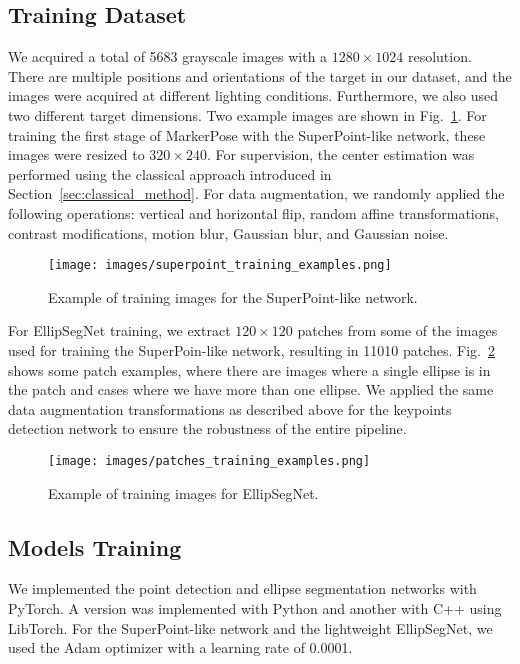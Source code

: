 \documentclass[final]{cvpr}
\begin{document}
\subsection{Training Dataset}
We acquired a total of 5683 grayscale images with a $1280 \times 1024$ resolution. There are multiple positions and orientations of the target in our dataset, and the images were acquired at different lighting conditions. Furthermore, we also used two different target dimensions. Two example images are shown in Fig.~\ref{fig:superpoint_training_example}. For training the first stage of MarkerPose with the SuperPoint-like network, these images were resized to $320 \times 240$. For supervision, the center estimation was performed using the classical approach introduced in Section~\ref{sec:classical_method}. For data augmentation, we randomly applied the following operations: vertical and horizontal flip, random affine transformations, contrast modifications, motion blur, Gaussian blur, and Gaussian noise.

\begin{figure}[h]
    \centering
    \texttt{[image: images/superpoint\_training\_examples.png]}
    \caption{Example of training images for the SuperPoint-like network.}
    \label{fig:superpoint_training_example}
\end{figure}

For EllipSegNet training, we extract $120 \times 120$ patches from some of the images used for training the SuperPoin-like network, resulting in 11010 patches. Fig.~\ref{fig:patches_training_examples} shows some patch examples, where there are images where a single ellipse is in the patch and cases where we have more than one ellipse. We applied the same data augmentation transformations as described above for the keypoints detection network to ensure the robustness of the entire pipeline.

\begin{figure}[h]
    \centering
    \texttt{[image: images/patches\_training\_examples.png]}
    \caption{Example of training images for EllipSegNet.}
    \label{fig:patches_training_examples}
\end{figure}



\subsection{Models Training}
We implemented the point detection and ellipse segmentation networks with PyTorch. A version was implemented with Python and another with C++ using LibTorch. For the SuperPoint-like network and the lightweight EllipSegNet, we used the Adam optimizer with a learning rate of 0.0001.
\end{document}
